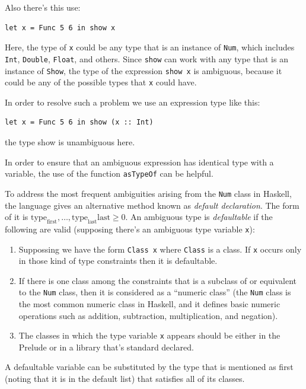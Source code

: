 \documentclass[a4paper, titlepage, twoside]{article}
\begin{document}
Also there’s this use:

\begin{verbatim}
let x = Func 5 6 in show x
\end{verbatim}

Here, the type of \texttt{x} could be any type that is an instance of \texttt{Num}, which includes \texttt{Int}, \texttt{Double}, \texttt{Float}, and others. Since \texttt{show} can work with any type that is an instance of \texttt{Show}, the type of the expression \texttt{show x} is ambiguous, because it could be any of the possible types that \texttt{x} could have.

In order to resolve such a problem we use an expression type like this:

\begin{verbatim}
let x = Func 5 6 in show (x :: Int)
\end{verbatim}
the type show is unambiguous here.

In order to ensure that an ambiguous expression has identical type with a variable, the use of the
function \texttt{asTypeOf} can be helpful.

To address the most frequent ambiguities arising from the \texttt{Num} class in Haskell, the language gives an alternative method known as \emph{default declaration}. The form of it is \(\text{type}_{\text{first}}, \dots, \text{type}_{\text{last}} \text{last} \geq 0\). An ambiguous type is \emph{defaultable} if the following are valid (supposing there’s an ambiguous type variable \texttt{x}):

\begin{enumerate}
\item Suppossing we have the form \texttt{Class x} where \texttt{Class} is a class. If \texttt{x} occurs only in those kind of type constraints then it is defaultable.
\item If there is one class among the constraints that is a subclass of or equivalent to the \texttt{Num} class, then it is considered as a ``numeric class'' (the \texttt{Num} class is the most common numeric class in Haskell, and it defines basic numeric operations such as addition, subtraction, multiplication, and negation).
\item The classes in which the type variable \texttt{x} appears should be either in the Prelude or in a library that's standard declared.
\end{enumerate}

A defaultable variable can be substituted by the type that is mentioned as first (noting that it is in the default list) that satisfies all of its classes.
\end{document}
